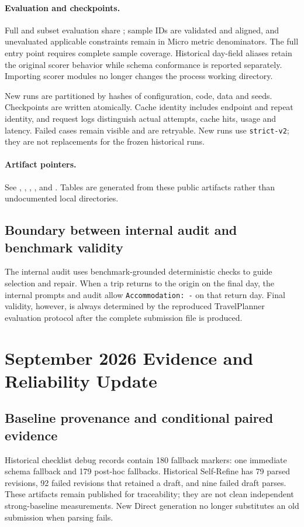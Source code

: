 \documentclass{article}
\begin{document}
\paragraph{Evaluation and checkpoints.}
Full and subset evaluation share ; sample IDs are
validated and aligned, and unevaluated applicable constraints remain in Micro
metric denominators. The full entry point requires complete sample coverage.
Historical day-field aliases retain the original scorer behavior while schema
conformance is reported separately. Importing scorer modules no longer changes
the process working directory.

New runs are partitioned by hashes of configuration, code, data and seeds.
Checkpoints are written atomically. Cache identity includes endpoint and repeat
identity, and request logs distinguish actual attempts, cache hits, usage and
latency. Failed cases remain visible and are retryable. New runs use
\texttt{strict-v2}; they are not replacements for the frozen historical runs.

\paragraph{Artifact pointers.}
See ,
,
,
, and
. Tables are generated from these public
artifacts rather than undocumented local directories.

\subsection{Boundary between internal audit and benchmark validity}
The internal audit uses benchmark-grounded deterministic checks to guide selection and repair. When a trip returns to the origin on the final day, the internal prompts and audit allow \texttt{Accommodation: -} on that return day. Final validity, however, is always determined by the reproduced TravelPlanner evaluation protocol after the complete submission file is produced.

\section{September 2026 Evidence and Reliability Update}
\label{sec:reliability-update}

\subsection{Baseline provenance and conditional paired evidence}
Historical checklist debug records contain 180 fallback markers: one immediate
schema fallback and 179 post-hoc fallbacks. Historical Self-Refine has 79 parsed
revisions, 92 failed revisions that retained a draft, and nine failed draft parses.
These artifacts remain published for traceability; they are not clean independent
strong-baseline measurements. New Direct generation no longer substitutes an old
submission when parsing fails.
\end{document}

